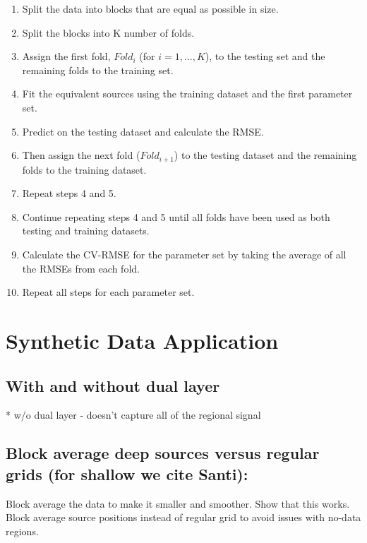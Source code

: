 \begin{enumerate}
    \item Split the data into blocks that are equal as possible in size.
    \item Split the blocks into K number of folds.
    \item Assign the first fold, $Fold_i$ (for $i= 1,..., K$), to the testing set and the remaining folds to the training set.
    \item Fit the equivalent sources using the training dataset and the first parameter set.
    \item Predict on the testing dataset and calculate the RMSE.
    \item Then assign the next fold ($Fold_{i+1}$) to the testing dataset and the remaining folds to the training dataset.
    \item Repeat steps 4 and 5.
    \item Continue repeating steps 4 and 5 until all folds have been used as both testing and training datasets.
    \item Calculate the CV-RMSE for the parameter set by taking the average of all the RMSEs from each fold.
    \item Repeat all steps for each parameter set.
\end{enumerate}
 





\section{Synthetic Data Application}

\subsection{With and without dual layer}
* w/o dual layer - doesn't capture all of the regional signal

\subsection{Block average deep sources versus regular grids (for shallow we cite Santi):}
Block average the data to make it smaller and smoother. Show that this works.
Block average source positions instead of regular grid to avoid issues with no-data regions.

